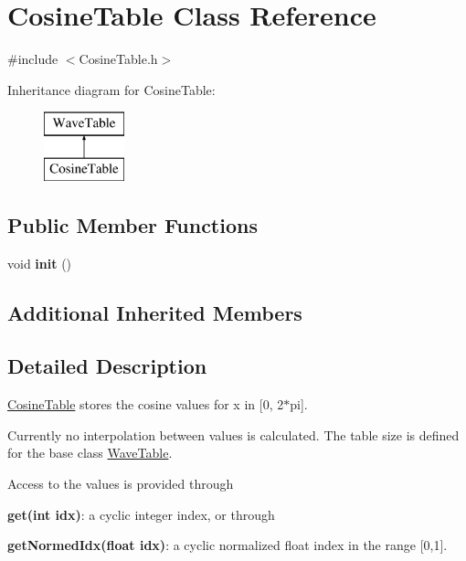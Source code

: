 \hypertarget{classCosineTable}{\section{Cosine\-Table Class Reference}
\label{classCosineTable}
}


{\ttfamily \#include $<$Cosine\-Table.\-h$>$}

Inheritance diagram for Cosine\-Table\-:\begin{figure}[H]
\begin{center}
\leavevmode
\includegraphics[height=2.000000cm]{classCosineTable}
\end{center}
\end{figure}
\subsection*{Public Member Functions}
\begin{DoxyCompactItemize}
\item 
\hypertarget{classCosineTable_aa44f664688eca2ff8de26b2ee5d78785}{void {\bfseries init} ()}\label{classCosineTable_aa44f664688eca2ff8de26b2ee5d78785}

\end{DoxyCompactItemize}
\subsection*{Additional Inherited Members}


\subsection{Detailed Description}
\hyperlink{classCosineTable}{Cosine\-Table} stores the cosine values for x in \mbox{[}0, 2$\ast$pi\mbox{]}.

Currently no interpolation between values is calculated. The table size is defined for the base class \hyperlink{classWaveTable}{Wave\-Table}.

Access to the values is provided through


\begin{DoxyItemize}
\item {\bfseries get(int idx)}\-: a cyclic integer index, or through
\item {\bfseries get\-Normed\-Idx(float idx)}\-: a cyclic normalized float index in the range \mbox{[}0,1\mbox{]}.
\end{DoxyItemize}

